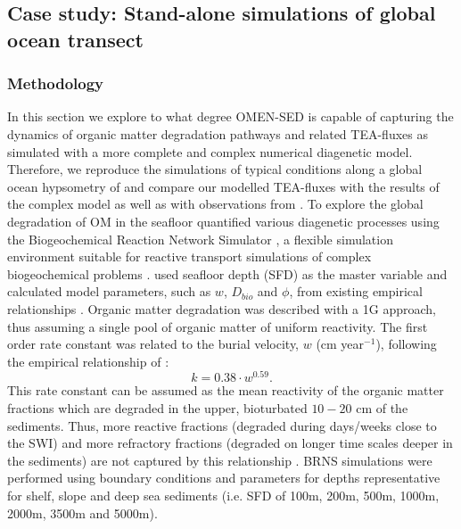 \documentclass[gmd, manuscript]{copernicus}
\begin{document}
\subsection{Case study: Stand-alone simulations of global ocean transect}\label{subsec:globalhypsometry}
\subsubsection{Methodology}
In this section we explore to what degree OMEN-SED is capable of capturing the dynamics of organic matter degradation pathways and related TEA-fluxes as simulated with a more complete and complex numerical diagenetic model. 
Therefore, we reproduce the simulations of typical conditions along a global ocean hypsometry of \citet{thullner_global_scale_2009} and compare our modelled TEA-fluxes with the results of the complex model as well as with 
observations from \citet{middelburg_denitrification_1996}. To explore the global degradation of OM in the seafloor 
\citet{thullner_global_scale_2009} quantified various diagenetic processes using the Biogeochemical Reaction Network Simulator \citep[BRNS,][]{aguilera_knowledge-based_2005}, 
a flexible simulation environment suitable for reactive transport simulations of complex biogeochemical problems \citep[e.g.][]{jourabchi_quantitative_2005, thullner_modeling_2005}. 
\citet{thullner_global_scale_2009} used seafloor depth (SFD) as the master variable and calculated model parameters, such as $w$, $D_{bio}$ and $\phi$, from existing empirical relationships 
\citep[e.g.][]{van1995metal, middelburg_empirical_1997}. 
Organic matter degradation was described with a 1G approach, thus assuming a single pool of organic matter of uniform reactivity. 
The first order rate constant was related to the burial velocity, $w$ (cm year$^{-1}$), following the empirical relationship of \citet{boudreau1997diagenetic}:
\begin{equation}
 k=0.38\cdot w^{0.59}.
\end{equation}
This rate constant can be assumed as the mean reactivity of the organic matter fractions which are degraded in the upper, bioturbated $10-20$ cm of the sediments. 
Thus, more reactive fractions (degraded during days/weeks close to the SWI) and more refractory fractions (degraded on longer time scales deeper in the sediments) are not captured by this relationship \citep{boudreau1997diagenetic}. 
BRNS simulations were performed using boundary conditions and parameters for depths representative for shelf, slope and deep sea sediments (i.e. SFD of 100m, 200m, 500m, 1000m, 2000m, 3500m and 5000m). 
\end{document}
